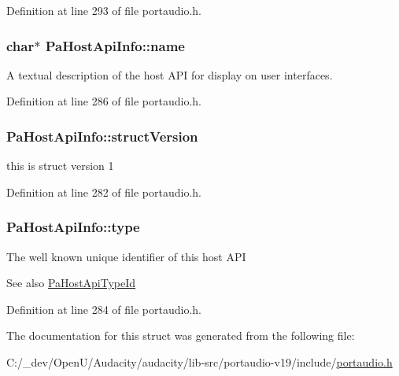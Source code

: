 Definition at line 293 of file portaudio.\+h.

\subsubsection[{\texorpdfstring{name}{name}}]{ char$\ast$ Pa\+Host\+Api\+Info\+::name}\hypertarget{struct_pa_host_api_info_a78afe5d557543c82cd9773229e25a8ec}{}\label{struct_pa_host_api_info_a78afe5d557543c82cd9773229e25a8ec}
A textual description of the host A\+PI for display on user interfaces. 

Definition at line 286 of file portaudio.\+h.

\subsubsection[{\texorpdfstring{struct\+Version}{structVersion}}]{ Pa\+Host\+Api\+Info\+::struct\+Version}\hypertarget{struct_pa_host_api_info_a1f3a8c465488e7af8024237256d80c14}{}\label{struct_pa_host_api_info_a1f3a8c465488e7af8024237256d80c14}
this is struct version 1 

Definition at line 282 of file portaudio.\+h.

\subsubsection[{\texorpdfstring{type}{type}}]{ Pa\+Host\+Api\+Info\+::type}\hypertarget{struct_pa_host_api_info_a5424bfcdf9f73b17cddc89e827a45d3f}{}\label{struct_pa_host_api_info_a5424bfcdf9f73b17cddc89e827a45d3f}
The well known unique identifier of this host A\+PI \begin{DoxySeeAlso}{See also}
\hyperlink{portaudio_8h_ae247ec252e84112170079ece319fc42c}{Pa\+Host\+Api\+Type\+Id} 
\end{DoxySeeAlso}


Definition at line 284 of file portaudio.\+h.



The documentation for this struct was generated from the following file\+:\begin{DoxyCompactItemize}
\item 
C\+:/\+\_\+dev/\+Open\+U/\+Audacity/audacity/lib-\/src/portaudio-\/v19/include/\hyperlink{portaudio_8h}{portaudio.\+h}\end{DoxyCompactItemize}
